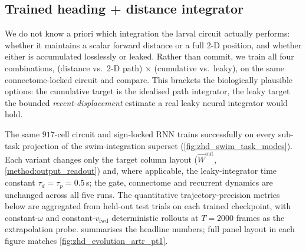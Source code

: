 \documentclass[11pt]{article}
\begin{document}
\subsection{Trained heading + distance integrator}
\label{sec:results_variants}

We do not know a priori which integration the larval circuit actually
performs: whether it maintains a scalar forward distance or a full
2-D position, and whether either is accumulated losslessly or leaked.
Rather than commit, we train all four combinations,
(distance vs.\ 2-D path) $\times$ (cumulative vs.\ leaky), on
the same connectome-locked circuit and compare. This brackets the
biologically plausible options: the cumulative target is the idealised
path integrator, the leaky target the bounded \emph{recent-displacement}
estimate a real leaky neural integrator would hold.

The same $917$-cell circuit and sign-locked RNN trains successfully
on every sub-task projection of the swim-integration superset
(\cref{fig:zhd_swim_task_modes}). Each variant changes only the
target column layout ($\hat W^{\mathrm{out}}$, \cref{method:output_readout})
and, where applicable, the leaky-integrator time constant
$\tau_d=\tau_p=0.5\,$s; the gate, connectome and recurrent dynamics
are unchanged across all five runs. The quantitative
trajectory-precision metrics below are aggregated from held-out test
trials on each trained checkpoint, with constant-$\omega$ and
constant-$v_{\mathrm{fwd}}$ deterministic rollouts at $T=2000$ frames
as the extrapolation probe.
 summarises the headline numbers; full
panel layout in each figure matches \cref{fig:zhd_evolution_artr_pt1}.
\end{document}
